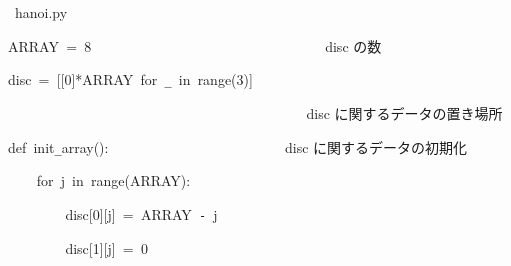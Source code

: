 \documentclass[a4paper,10pt]{article}
\def\mc{\relax}
\begin{document}
\noindent
\mbox{}\hfill

\noindent
\mbox{}\hfill

\noindent
\mbox{}\rm\mc {\tt\#} \hrulefill\ hanoi.py \ \hrulefill
\tt\mc 

\noindent
\mbox{}\hfill

\noindent
\mbox{}\hfill

\noindent
\mbox{}ARRAY{\tt\mc \ }={\tt\mc \ }8{\tt\mc \ }{\tt\mc \ }{\tt\mc \ }{\tt\mc \ }{\tt\mc \ }{\tt\mc \ }{\tt\mc \ }{\tt\mc \ }{\tt\mc \ }{\tt\mc \ }{\tt\mc \ }{\tt\mc \ }{\tt\mc \ }{\tt\mc \ }{\tt\mc \ }{\tt\mc \ }{\tt\mc \ }{\tt\mc \ }{\tt\mc \ }{\tt\mc \ }{\tt\mc \ }{\tt\mc \ }{\tt\mc \ }{\tt\mc \ }{\tt\mc \ }{\tt\mc \ }{\tt\mc \ }{\tt\mc \ }{\tt\mc \ }{\tt\mc \ }{\tt\mc \ }\rm\mc {\tt\#} \ disc の数 \hfill 
\tt\mc 

\noindent
\mbox{}\hfill

\noindent
\mbox{}disc{\tt\mc \ }={\tt\mc \ }[[0]*ARRAY{\tt\mc \ }for{\tt\mc \ }{\tt\_}{\tt\mc \ }in{\tt\mc \ }range(3)]

\noindent
\mbox{}{\tt\mc \ }{\tt\mc \ }{\tt\mc \ }{\tt\mc \ }{\tt\mc \ }{\tt\mc \ }{\tt\mc \ }{\tt\mc \ }{\tt\mc \ }{\tt\mc \ }{\tt\mc \ }{\tt\mc \ }{\tt\mc \ }{\tt\mc \ }{\tt\mc \ }{\tt\mc \ }{\tt\mc \ }{\tt\mc \ }{\tt\mc \ }{\tt\mc \ }{\tt\mc \ }{\tt\mc \ }{\tt\mc \ }{\tt\mc \ }{\tt\mc \ }{\tt\mc \ }{\tt\mc \ }{\tt\mc \ }{\tt\mc \ }{\tt\mc \ }{\tt\mc \ }{\tt\mc \ }{\tt\mc \ }{\tt\mc \ }{\tt\mc \ }{\tt\mc \ }{\tt\mc \ }{\tt\mc \ }{\tt\mc \ }{\tt\mc \ }\rm\mc {\tt\#} \ disc に関するデータの置き場所 \hfill 
\tt\mc 

\noindent
\mbox{}\hfill

\noindent
\mbox{}def{\tt\mc \ }init{\tt\_}array():{\tt\mc \ }{\tt\mc \ }{\tt\mc \ }{\tt\mc \ }{\tt\mc \ }{\tt\mc \ }{\tt\mc \ }{\tt\mc \ }{\tt\mc \ }{\tt\mc \ }{\tt\mc \ }{\tt\mc \ }{\tt\mc \ }{\tt\mc \ }{\tt\mc \ }{\tt\mc \ }{\tt\mc \ }{\tt\mc \ }{\tt\mc \ }{\tt\mc \ }{\tt\mc \ }{\tt\mc \ }{\tt\mc \ }\rm\mc {\tt\#} \ disc に関するデータの初期化 \hfill 
\tt\mc 

\noindent
\mbox{}{\tt\mc \ }{\tt\mc \ }{\tt\mc \ }{\tt\mc \ }for{\tt\mc \ }j{\tt\mc \ }in{\tt\mc \ }range(ARRAY):

\noindent
\mbox{}{\tt\mc \ }{\tt\mc \ }{\tt\mc \ }{\tt\mc \ }{\tt\mc \ }{\tt\mc \ }{\tt\mc \ }{\tt\mc \ }disc[0][j]{\tt\mc \ }={\tt\mc \ }ARRAY{\tt\mc \ }{\tt -}{\tt\mc \ }j

\noindent
\mbox{}{\tt\mc \ }{\tt\mc \ }{\tt\mc \ }{\tt\mc \ }{\tt\mc \ }{\tt\mc \ }{\tt\mc \ }{\tt\mc \ }disc[1][j]{\tt\mc \ }={\tt\mc \ }0
\end{document}
